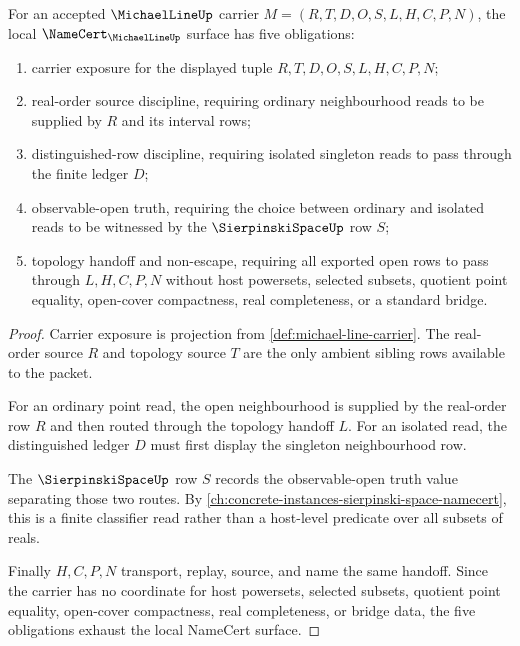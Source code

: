 \begin{theorem}
\label{thm:michael-line-namecert-obligations}
For an accepted $\MichaelLineUp$ carrier $M=(R,T,D,O,S,L,H,C,P,N)$, the local $\NameCert_{\MichaelLineUp}$ surface has five obligations:
\begin{enumerate}
\item carrier exposure for the displayed tuple $R,T,D,O,S,L,H,C,P,N$;
\item real-order source discipline, requiring ordinary neighbourhood reads to be supplied by $R$ and its interval rows;
\item distinguished-row discipline, requiring isolated singleton reads to pass through the finite ledger $D$;
\item observable-open truth, requiring the choice between ordinary and isolated reads to be witnessed by the $\SierpinskiSpaceUp$ row $S$;
\item topology handoff and non-escape, requiring all exported open rows to pass through $L,H,C,P,N$ without host powersets, selected subsets, quotient point equality, open-cover compactness, real completeness, or a standard bridge.
\end{enumerate}
\end{theorem}
\begin{proof}
Carrier exposure is projection from \autoref{def:michael-line-carrier}. The real-order source $R$ and topology source $T$ are the only ambient sibling rows available to the packet.

For an ordinary point read, the open neighbourhood is supplied by the real-order row $R$ and then routed through the topology handoff $L$. For an isolated read, the distinguished ledger $D$ must first display the singleton neighbourhood row.

The $\SierpinskiSpaceUp$ row $S$ records the observable-open truth value separating those two routes. By \autoref{ch:concrete-instances-sierpinski-space-namecert}, this is a finite classifier read rather than a host-level predicate over all subsets of reals.

Finally $H,C,P,N$ transport, replay, source, and name the same handoff. Since the carrier has no coordinate for host powersets, selected subsets, quotient point equality, open-cover compactness, real completeness, or bridge data, the five obligations exhaust the local NameCert surface.
\end{proof}

